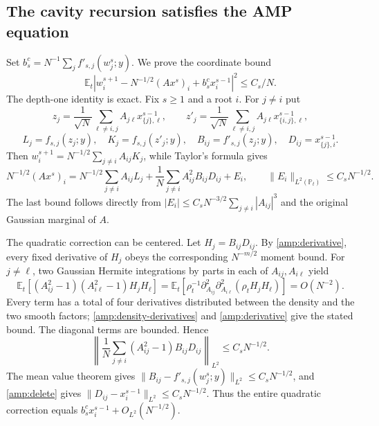 \documentclass[11pt,reqno]{amsart}
\begin{document}
\subsection{The cavity recursion satisfies the AMP equation}

Set $b_s^c=N^{-1}\sum_j f'_{s,j}(w_j^s;y)$.  We prove the coordinate bound
\begin{equation}\label{amp:defect}
 \mathbb E_t\left|w_i^{s+1}
       -N^{-1/2}(Ax^s)_i+b_s^c x_i^{s-1}\right|^2
 \le C_s/N.
\end{equation}
The depth-one identity is exact.  Fix $s\ge1$ and a root $i$.  For $j\ne i$
put
\[
 z_j=\frac1{\sqrt N}\sum_{\ell\ne i,j}A_{j\ell}
          x^{s-1}_{\{j\},\ell},\qquad
 z'_j=\frac1{\sqrt N}\sum_{\ell\ne i,j}A_{j\ell}
          x^{s-1}_{\{i,j\},\ell},
\]
\[
 L_j=f_{s,j}(z_j;y),\quad K_j=f_{s,j}(z'_j;y),\quad
 B_{ij}=f'_{s,j}(z_j;y),\quad D_{ij}=x^{s-1}_{\{j\},i}.
\]
Then $w_i^{s+1}=N^{-1/2}\sum_{j\ne i}A_{ij}K_j$, while Taylor's formula
gives
\[
 N^{-1/2}(Ax^s)_i
 =N^{-1/2}\sum_{j\ne i}A_{ij}L_j
   +\frac1N\sum_{j\ne i}A_{ij}^2B_{ij}D_{ij}+E_i,
 \qquad \|E_i\|_{L^2(\mathbb P_t)}\le C_sN^{-1/2}.
\]
The last bound follows directly from
$|E_i|\le C_sN^{-3/2}\sum_{j\ne i}|A_{ij}|^3$ and the original Gaussian
marginal of $A$.

The quadratic correction can be centered.  Let $H_j=B_{ij}D_{ij}$.
By \eqref{amp:derivative}, every fixed derivative of $H_j$ obeys the
corresponding $N^{-m/2}$ moment bound.  For $j\ne\ell$, two Gaussian
Hermite integrations by parts in each of $A_{ij},A_{i\ell}$ yield
\[
 \mathbb E_t[(A_{ij}^2-1)(A_{i\ell}^2-1)H_jH_\ell]
 =\mathbb E_t\left[
  \rho_t^{-1}\partial_{A_{ij}}^2\partial_{A_{i\ell}}^2
                  (\rho_tH_jH_\ell)\right]=O(N^{-2}).
\]
Every term has a total of four derivatives distributed between the
density and the two smooth factors; \eqref{amp:density-derivatives}
and \eqref{amp:derivative} give the stated bound.  The diagonal terms
are bounded.  Hence
\[
 \left\|\frac1N\sum_{j\ne i}(A_{ij}^2-1)B_{ij}D_{ij}\right\|_{L^2}
 \le C_sN^{-1/2}.
\]
The mean value theorem gives
$\|B_{ij}-f'_{s,j}(w_j^s;y)\|_{L^2}\le C_sN^{-1/2}$, and
\eqref{amp:delete} gives
$\|D_{ij}-x_i^{s-1}\|_{L^2}\le C_sN^{-1/2}$.  Thus the entire quadratic
correction equals $b_s^cx_i^{s-1}+O_{L^2}(N^{-1/2})$.
\end{document}
